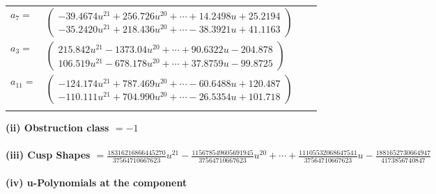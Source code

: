 \documentclass[1p]{elsarticle_modified}
\theoremstyle{definition}
\begin{document}
\begin{tabular}{m{7pt} m{180pt} m{7pt} m{180pt} }
\flushright $a_{7}=$&$\begin{pmatrix}-39.4674 u^{21}+256.726 u^{20}+\cdots+14.2498 u+25.2194\\-35.2420 u^{21}+218.436 u^{20}+\cdots-38.3921 u+41.1163\end{pmatrix}$ \\
\flushright $a_{3}=$&$\begin{pmatrix}215.842 u^{21}-1373.04 u^{20}+\cdots+90.6322 u-204.878\\106.519 u^{21}-678.178 u^{20}+\cdots+37.8759 u-99.8725\end{pmatrix}$ \\
\flushright $a_{11}=$&$\begin{pmatrix}-124.174 u^{21}+787.469 u^{20}+\cdots-60.6488 u+120.487\\-110.111 u^{21}+704.990 u^{20}+\cdots-26.5354 u+101.718\end{pmatrix}$\\&\end{tabular}
\flushleft \textbf{(ii) Obstruction class $= -1$}\\~\\
\flushleft \textbf{(iii) Cusp Shapes $= \frac{18316216866445270}{37564710667623} u^{21}-\frac{115678549605691945}{37564710667623} u^{20}+\cdots+\frac{11105532068647541}{37564710667623} u-\frac{1881652730664947}{4173856740847}$}\\~\\
\newpage\renewcommand{\arraystretch}{1}
\flushleft \textbf{(iv) u-Polynomials at the component}\newline \\
\end{document}
